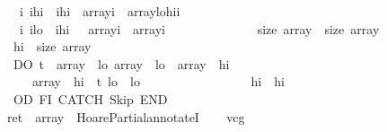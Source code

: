 \begin{isabellebody}
\ \ \ \ \ \ \ \ \ \ \ \ {\isacharparenleft}\ {\isasymforall}i{\isachardot}\ i{\isacharless}\isactrlbsup {\isasymsigma}\isactrlesup hi\ {\isasymand}\ i{\isachargreater}{\isasymacute}hi\ {\isasymlongrightarrow}\ {\isasymacute}array{\isacharbang}i\ {\isacharequal}\ \isactrlbsup {\isasymsigma}\isactrlesup array{\isacharbang}{\isacharparenleft}\isactrlbsup {\isasymsigma}\isactrlesup lo{\isacharplus}\isactrlbsup {\isasymsigma}\isactrlesup hi{\isacharminus}i{\isacharminus}{}{\isacharparenright}{\isacharparenright}\ {\isasymand}\isanewline
\ \ \ \ \ \ \ \ \ \ \ \ {\isacharparenleft}\ {\isasymforall}i{\isachardot}\ i{\isasymge}{\isasymacute}lo\ {\isasymand}\ i{\isasymle}{\isasymacute}hi\ \ {\isasymlongrightarrow}\ {\isasymacute}array{\isacharbang}i\ {\isacharequal}\ \isactrlbsup {\isasymsigma}\isactrlesup array{\isacharbang}{\isacharparenleft}i{\isacharparenright}\ {\isacharparenright}\ {\isasymand}\isanewline
\ \ \ \ \ \ \ \ \ \ \ \ {\isacharparenleft}size\ {\isasymacute}array\ {\isacharequal}\ size\ \isactrlbsup {\isasymsigma}\isactrlesup array{\isacharparenright}\ {\isasymand}\isanewline
\ \ \ \ \ \ \ \ \ \ \ \ {\isacharparenleft}\isactrlbsup {\isasymsigma}\isactrlesup hi\ {\isasymle}\ size\ \isactrlbsup {\isasymsigma}\isactrlesup array{\isacharparenright}\isanewline
\ \ \ \ \ \ \ \ \ \ \ \ {\isasymrbrace}\isanewline
\ \ \ \ \ \ \ \ \ \ \ \ DO\ {\isasymacute}t\ {\isacharcolon}{\isacharequal}{\isacharequal}\ {\isasymacute}array\ {\isacharbang}\ {\isasymacute}lo{\isacharsemicolon}{\isacharsemicolon}\ {\isasymacute}array\ {\isacharbang}\ {\isasymacute}lo\ {\isacharcolon}{\isacharequal}{\isacharequal}\ {\isasymacute}array\ {\isacharbang}\ {\isasymacute}hi{\isacharsemicolon}{\isacharsemicolon}\isanewline
\ \ \ \ \ \ \ \ \ \ \ \ \ \ \ {\isasymacute}array\ {\isacharbang}\ {\isasymacute}hi\ {\isacharcolon}{\isacharequal}{\isacharequal}\ {\isasymacute}t{\isacharsemicolon}{\isacharsemicolon}\ {\isasymacute}lo\ {\isacharcolon}{\isacharequal}{\isacharequal}\ {\isasymacute}lo\ {\isacharplus}\ {}{\isacharsemicolon}{\isacharsemicolon}\isanewline
\ \ \ \ \ \ \ \ \ \ \ \ \ \ \ {\isasymacute}hi\ {\isacharcolon}{\isacharequal}{\isacharequal}\ {\isasymacute}hi\ {\isacharminus}\ {}\ \isanewline
\ \ \ \ \ \ \ \ \ \ \ \ OD\ FI\ CATCH\ Skip\ END{\isacharsemicolon}{\isacharsemicolon}\isanewline
\ \ \ \ \ \ \ \ \ \ \ {\isasymacute}ret\ {\isacharcolon}{\isacharequal}{\isacharequal}\ {\isasymacute}array{\isachardoublequoteclose}\ \ HoarePartial{\isachardot}annotateI{\isacharparenright}\isanewline
\ \ \isamarkupfalse%
\ vcg\isanewline

\end{isabellebody}
